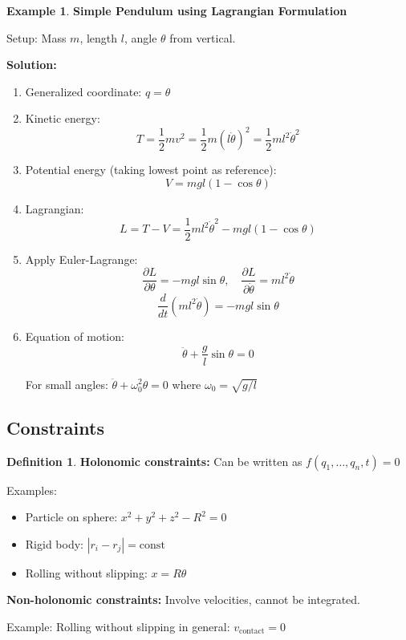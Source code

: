 \documentclass[12pt,a4paper]{article}
\theoremstyle{definition}
\newtheorem{definition}[theorem]{Definition}
\newtheorem{example}[theorem]{Example}
\begin{document}
\begin{example}
\textbf{Simple Pendulum using Lagrangian Formulation}

Setup: Mass $m$, length $l$, angle $\theta$ from vertical.

\textbf{Solution:}
\begin{enumerate}
    \item Generalized coordinate: $q = \theta$
    
    \item Kinetic energy:
    \[
    T = \frac{1}{2}m v^2 = \frac{1}{2}m(l\dot{\theta})^2 = \frac{1}{2}ml^2\dot{\theta}^2
    \]
    
    \item Potential energy (taking lowest point as reference):
    \[
    V = mgl(1 - \cos\theta)
    \]
    
    \item Lagrangian:
    \[
    L = T - V = \frac{1}{2}ml^2\dot{\theta}^2 - mgl(1 - \cos\theta)
    \]
    
    \item Apply Euler-Lagrange:
    \[
    \frac{\partial L}{\partial \theta} = -mgl\sin\theta, \quad \frac{\partial L}{\partial \dot{\theta}} = ml^2\dot{\theta}
    \]
    \[
    \frac{d}{dt}(ml^2\dot{\theta}) = -mgl\sin\theta
    \]
    
    \item Equation of motion:
    \[
    \ddot{\theta} + \frac{g}{l}\sin\theta = 0
    \]
    
    For small angles: $\ddot{\theta} + \omega_0^2\theta = 0$ where $\omega_0 = \sqrt{g/l}$
\end{enumerate}
\end{example}

\subsection{Constraints}

\begin{definition}
\textbf{Holonomic constraints:} Can be written as $f(q_1, \ldots, q_n, t) = 0$

Examples:
\begin{itemize}
    \item Particle on sphere: $x^2 + y^2 + z^2 - R^2 = 0$
    \item Rigid body: $|r_i - r_j| = \text{const}$
    \item Rolling without slipping: $x = R\theta$
\end{itemize}

\textbf{Non-holonomic constraints:} Involve velocities, cannot be integrated.

Example: Rolling without slipping in general: $v_{\text{contact}} = 0$
\end{definition}
\end{document}
